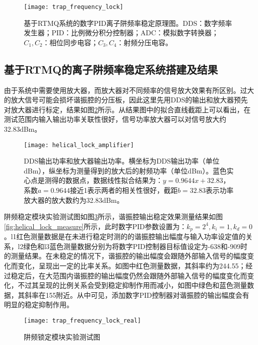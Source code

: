 \begin{figure}
    \centering
    \caption[数字PID离子阱频率稳定原理图]{基于RTMQ系统的数字PID离子阱频率稳定原理图。DDS：数字频率发生器；PID：比例微分积分控制器；ADC：模拟数字转换器；$C_1,C_2$：相位同步电容；$C_3,C_4$：射频分压电容。\label{fig:trap_frequency_lock}}
    \texttt{[image: trap\_frequency\_lock]}
\end{figure}


\subsection[基于RTMQ的离子阱频率稳定系统搭建及结果]{基于RTMQ的离子阱频率稳定系统搭建及结果}

由于系统中需要使用放大器，而放大器对不同频率的信号放大效果有所区别。过大的放大信号可能会损坏谐振腔的分压板，因此这里先用DDS的输出和放大器预先对放大器进行标定，结果如图\ref{fig:helical_lock_amplifier}所示。从结果图中的拟合直线截距上可以看出，在测试范围内输入输出功率关联性很好，信号功率放大器可以对信号放大约32.83dBm。

\begin{figure}
    \centering
    \caption[DDS输出功率和放大器输出功率]{DDS输出功率和放大器输出功率。横坐标为DDS输出功率（单位dBm），纵坐标为测量得到的放大后的射频功率（单位dBm）。蓝色实心点是测得的数据点，数据线性拟合结果为：$y=0.9644x+32.83$，系数$a=0.9644$接近1表示两者的相关性很好，截距$b=32.83$表示功率放大器的放大数约为32.83dBm。\label{fig:helical_lock_amplifier}}
    \texttt{[image: helical\_lock\_amplifier]}
\end{figure}






阱频稳定模块实验测试图如图\ref{fig:trap_frequency_lock_real}所示，谐振腔输出稳定效果测量结果如图\ref{fig:helical_lock_measure}所示，此时数字PID参数设置为：$k_p=2^4,k_i=1,k_d=0$。l1红色测量数据是在未进行稳定时测的的谐振腔输出幅度与输入功率设定值的关系，l2绿色和l3蓝色测量数据分别为将数字PID控制器目标值设定为-638和-909时的测量结果。在未稳定的情况下，谐振腔的输出幅度会跟随外部输入信号的幅度变化而变化，呈现出一定的比率关系。如图中红色测量数据，其斜率约为244.55；经过稳定后，在大范围内谐振腔的输出幅度仍然会跟随外部输入信号的幅度变化而变化，不过其呈现的比例关系会受到稳定抑制作用而减小，如图中绿色和蓝色测量数据，其斜率在155附近。从中可见，添加数字PID控制器对谐振腔的输出幅度会有明显的稳定抑制作用。

\begin{figure}
    \centering
    \caption[阱频锁定模块实验测试图]{阱频锁定模块实验测试图\label{fig:trap_frequency_lock_real}}
    \texttt{[image: trap\_frequency\_lock\_real]}
\end{figure}



